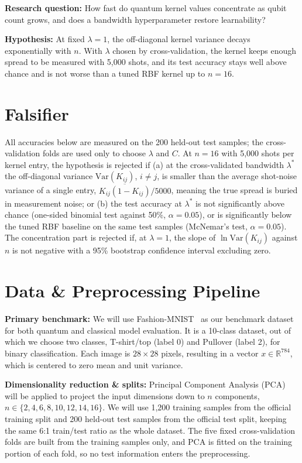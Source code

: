 \documentclass[conference]{IEEEtran}
\begin{document}
\textbf{Research question:} How fast do quantum kernel values concentrate as qubit count grows, and does a bandwidth hyperparameter restore learnability?

\textbf{Hypothesis:} At fixed $\lambda=1$, the off-diagonal kernel variance decays exponentially with $n$. With $\lambda$ chosen by cross-validation, the kernel keeps enough spread to be measured with 5{,}000 shots, and its test accuracy stays well above chance and is not worse than a tuned RBF kernel up to $n=16$.

\section{Falsifier}
All accuracies below are measured on the 200 held-out test samples; the cross-validation folds are used only to choose $\lambda$ and $C$. At $n=16$ with 5{,}000 shots per kernel entry, the hypothesis is rejected if (a) at the cross-validated bandwidth $\lambda^{*}$ the off-diagonal variance $\mathrm{Var}(K_{ij})$, $i\neq j$, is smaller than the average shot-noise variance of a single entry, $\overline{K_{ij}(1-K_{ij})}/5000$, meaning the true spread is buried in measurement noise; or (b) the test accuracy at $\lambda^{*}$ is not significantly above chance (one-sided binomial test against 50\%, $\alpha=0.05$), or is significantly below the tuned RBF baseline on the same test samples (McNemar's test, $\alpha=0.05$). The concentration part is rejected if, at $\lambda=1$, the slope of $\ln\mathrm{Var}(K_{ij})$ against $n$ is not negative with a 95\% bootstrap confidence interval excluding zero.

\section{Data \& Preprocessing Pipeline}
\textbf{Primary benchmark:} We will use Fashion-MNIST~\cite{xiao2017fashion} as our benchmark dataset for both quantum and classical model evaluation. It is a 10-class dataset, out of which we choose two classes, T-shirt/top (label 0) and Pullover (label 2), for binary classification. Each image is $28\times28$ pixels, resulting in a vector $x\in\mathbb{R}^{784}$, which is centered to zero mean and unit variance.

\textbf{Dimensionality reduction \& splits:} Principal Component Analysis (PCA) will be applied to project the input dimensions down to $n$ components, $n\in\{2,4,6,8,10,12,14,16\}$. We will use 1{,}200 training samples from the official training split and 200 held-out test samples from the official test split, keeping the same 6:1 train/test ratio as the whole dataset. The five fixed cross-validation folds are built from the training samples only, and PCA is fitted on the training portion of each fold, so no test information enters the preprocessing.
\end{document}
